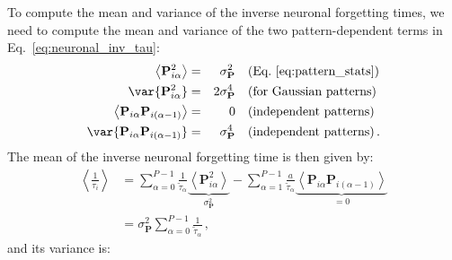 %
To compute the mean and variance of the inverse neuronal forgetting times, we need to compute the mean and variance of the two pattern-dependent terms in Eq.~\ref{eq:neuronal_inv_tau}: 
\begin{equation}
    \begin{aligned}
        \left< \mathbf{P}_{i\alpha}^2 \right> & = & \sigma_\mathbf{P}^2 & \quad \textrm{(Eq.~\ref{eq:pattern_stats})}\\
        \var{\mathbf{P}_{i\alpha}^2} & = & 2 \sigma_{\mathbf{P}}^4 &  \quad \textrm{(for Gaussian patterns)} \\
        \left< \mathbf{P}_{i\alpha} \mathbf{P}_{i(\alpha-1)} \right> & = & 0 & \quad \textrm{(independent patterns)}\\
        \var{\mathbf{P}_{i\alpha} \mathbf{P}_{i(\alpha-1)}} & = & \sigma_{\mathbf{P}}^4 & \quad \textrm{(independent patterns)} \,.
    \end{aligned}
\end{equation}
The mean of the inverse neuronal forgetting time is then given by: 
\begin{equation}
  \begin{aligned}
    \left<\frac{1}{\tau_i}\right>
    &= \sum_{\alpha=0}^{P-1} \frac{1}{\tilde{\tau}_\alpha} \underbrace{\left< \mathbf{P}_{i \alpha}^2 \right>}_{\sigma_\mathbf{P}^2} - \sum_{\alpha=1}^{P-1}\frac{a}{\tilde{\tau}_\alpha} \underbrace{\left< \mathbf{P}_{i \alpha}\mathbf{P}_{i (\alpha - 1)} \right>}_{=0}  \\
    &= \sigma_{\mathbf{P}}^2 \sum_{\alpha=0}^{P-1} \frac{1}{\tilde{\tau}_\alpha} \,,
    \label{eq:expectation_neuronal_inv_tau}
  \end{aligned}
\end{equation}
and its variance is: 
